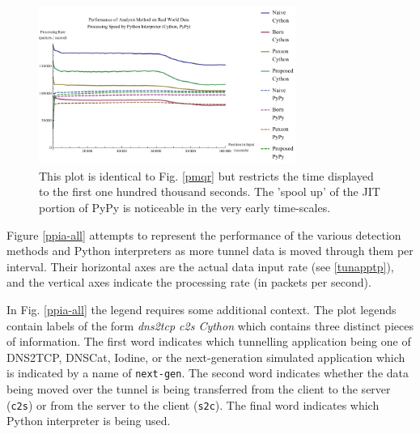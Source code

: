 \documentclass{llncs}
\begin{document}

\begin{figure}
\centering
\includegraphics[width=0.75\textwidth]{../figures/pmqr-100k.pdf}
\caption[Performance of Analysis Method and Python Interpreter on Real World
Data - Early Time]{This plot is identical to Fig. \ref{pmqr} but restricts the time
displayed to the first one hundred thousand seconds. The 'spool up' of the JIT
portion of PyPy is noticeable in the very early time-scales.}
\label{pmqr-100k}
\end{figure}


Figure \ref{ppia-all} attempts
to represent the performance of the various
detection methods and Python interpreters as more tunnel data is moved through
them per interval. Their horizontal axes are the actual data input rate (see \ref{tunapptp}), and the vertical axes indicate the
processing rate (in packets per second).

In Fig. \ref{ppia-all} the legend requires some additional context. The
plot legends contain labels of the form \emph{dns2tcp c2s Cython} which contains
three distinct pieces of information. The first word indicates which tunnelling
application being one of DNS2TCP, DNSCat, Iodine, or the next-generation simulated application which is indicated by a name of \texttt{next-gen}. The
second word indicates whether the data being moved over the tunnel is being
transferred from the client to the server (\texttt{c2s}) or from the server to
the client (\texttt{s2c}). The final word indicates which Python interpreter is
being used.
\end{document}
